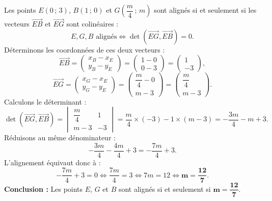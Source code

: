 \documentclass[11pt,a4paper]{article}
\newcommand{\vect}[1]{\overrightarrow{#1}}
\begin{document}
\begin{correctionbox}
\begin{enumerate}
    Les points $E(0\,;\,3)$, $B(1\,;\,0)$ et $G\left(\dfrac{m}{4}\,;\, m\right)$ sont alignés si et seulement si les vecteurs $\vect{EB}$ et $\vect{EG}$ sont colinéaires :
    \[
    E, G, B \text{ alignés} \iff \det(\vect{EG}, \vect{EB}) = 0.
    \]
    Déterminons les coordonnées de ces deux vecteurs :
    \[
    \vect{EB} = \begin{pmatrix} x_B - x_E \\ y_B - y_E \end{pmatrix} = \begin{pmatrix} 1 - 0 \\ 0 - 3 \end{pmatrix} = \begin{pmatrix} 1 \\ -3 \end{pmatrix},
    \]
    \[
    \vect{EG} = \begin{pmatrix} x_G - x_E \\ y_G - y_E \end{pmatrix} = \begin{pmatrix} \dfrac{m}{4} - 0 \\ m - 3 \end{pmatrix} = \begin{pmatrix} \dfrac{m}{4} \\ m - 3 \end{pmatrix}.
    \]
    Calculons le déterminant :
    \[
    \det(\vect{EG}, \vect{EB}) = \begin{vmatrix} \dfrac{m}{4} & 1 \\ m - 3 & -3 \end{vmatrix} = \frac{m}{4} \times (-3) - 1 \times (m - 3) = -\frac{3m}{4} - m + 3.
    \]
    Réduisons au même dénominateur :
    \[
    -\frac{3m}{4} - \frac{4m}{4} + 3 = -\frac{7m}{4} + 3.
    \]
    L'alignement équivaut donc à :
    \[
    -\frac{7m}{4} + 3 = 0 \iff \frac{7m}{4} = 3 \iff 7m = 12 \iff \mathbf{m = \frac{12}{7}}.
    \]
    \textbf{Conclusion :} Les points $E$, $G$ et $B$ sont alignés si et seulement si $\mathbf{m = \dfrac{12}{7}}$.
    
    \begin{center}
\end{center}
\end{enumerate}
\end{correctionbox}
\end{document}
